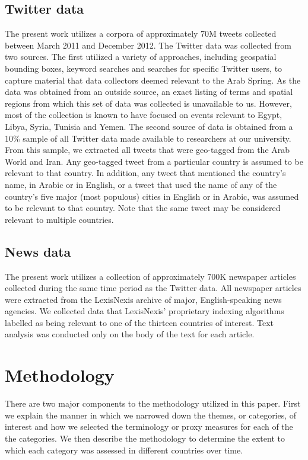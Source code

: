 \subsection{Twitter data}

The present work utilizes a corpora of approximately 70M tweets collected between March 2011 and December 2012. The Twitter data was collected from two sources. The first utilized a variety of approaches, including geospatial bounding boxes, keyword searches and searches for specific Twitter users, to capture material that data collectors deemed relevant to the Arab Spring. As the data was obtained from an outside source, an exact listing of terms and spatial regions from which this set of data was collected is unavailable to us. However, most of the collection is known to have focused on events relevant to Egypt, Libya, Syria, Tunisia and Yemen. The second source of data is obtained from a 10\% sample of all Twitter data made available to researchers at our university. From this sample, we extracted all tweets that were geo-tagged from the Arab World and Iran. Any geo-tagged tweet from a particular country is assumed to be relevant to that country. In addition, any tweet that mentioned the country’s name, in Arabic or in English, or a tweet that used the name of any of the country’s five major (most populous) cities in English or in Arabic, was assumed to be relevant to that country. Note that the same tweet may be considered relevant to multiple countries. 

\subsection{News data}
The present work utilizes a collection of approximately 700K newspaper articles collected during the same time period as the Twitter data. All newspaper articles were extracted from the LexisNexis archive of major, English-speaking news agencies. We collected data that LexisNexis’ proprietary indexing algorithms labelled as being relevant to one of the thirteen countries of interest. Text analysis was conducted only on the body of the text for each article.

\section{Methodology}

There are two major components to the methodology utilized in this paper. First we explain  the manner in which we narrowed down the themes, or categories, of interest and how we selected the terminology or proxy measures for each of the the categories. We then describe the methodology to determine the extent to which each category was assessed in different countries over time. 
